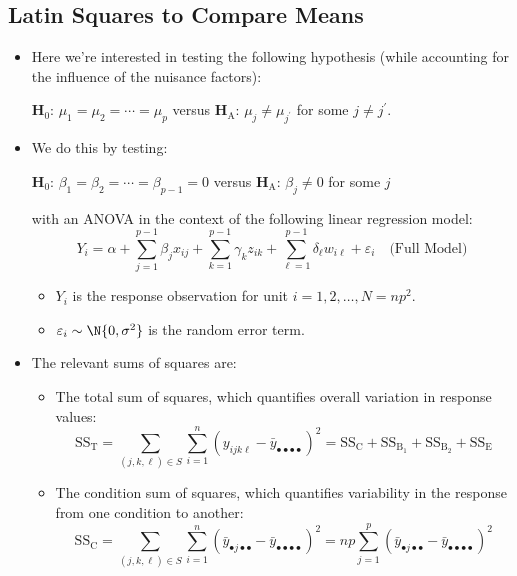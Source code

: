 \subsection{Latin Squares to Compare Means}
\begin{itemize}
      \item Here we're interested in testing the following hypothesis (while accounting for the influence of the
            nuisance factors):
            \begin{tightcenter}
                  $ \mathbf{H}_0 $: $ \mu_1=\mu_2=\cdots=\mu_p $ versus $ \mathbf{H}_\text{A} $: $ \mu_j\ne \mu_{j^\prime} $ for some $ j\ne j^\prime $.
            \end{tightcenter}
      \item We do this by testing:
            \begin{tightcenter}
                  $ \mathbf{H}_0 $: $ \beta_1=\beta_2=\cdots=\beta_{p-1}=0 $ versus $ \mathbf{H}_\text{A} $: $ \beta_j\ne 0$ for some $ j $
            \end{tightcenter}
            with an ANOVA in the context of the following linear regression model:
            \[ Y_i=\alpha+\sum_{j=1}^{p-1} \beta_j x_{ij}+\sum_{k=1}^{p-1} \gamma_k z_{ik}+\sum_{\ell=1}^{p-1} \delta_\ell w_{i\ell}+\varepsilon_i\quad \text{(Full Model)} \]
            \begin{itemize}
                  \item $ Y_i $ is the response observation for unit $ i=1,2,\ldots,N=np^2 $.
                  \item $ \varepsilon_i \sim \N{0,\sigma^2} $ is the random error term.
            \end{itemize}
      \item The relevant sums of squares are:
            \begin{itemize}
                  \item The total sum of squares, which quantifies overall variation in response values:
                        \[ \text{SS}_\text{T}=\sum_{(j,k,\ell)\in S}\sum_{i=1}^{n} (y_{ijk\ell}-\bar{y}_{\bullet\bullet\bullet\bullet})^2=\text{SS}_{\text{C}}+\text{SS}_{\text{B}_1}+\text{SS}_{\text{B}_2}+\text{SS}_{\text{E}}  \]
                  \item The condition sum of squares, which quantifies variability in the response from one condition to another:
                        \[ \text{SS}_{\text{C}}=\sum_{(j,k,\ell)\in S}\sum_{i=1}^{n} (\bar{y}_{\bullet j\bullet\bullet}-\bar{y}_{\bullet\bullet\bullet\bullet})^2=np \sum_{j=1}^{p} (\bar{y}_{\bullet j\bullet\bullet}-\bar{y}_{\bullet\bullet\bullet\bullet})^2  \]

\end{itemize}
\end{itemize}
